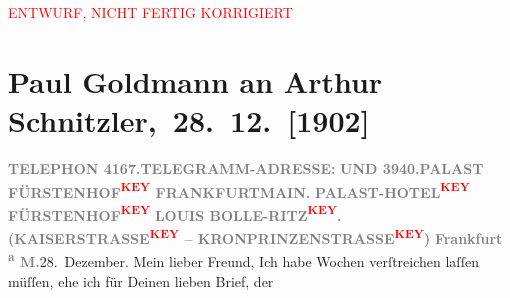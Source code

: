 
\begin{center}
            \textcolor{red}{ENTWURF, NICHT FERTIG KORRIGIERT}
                      \end{center}
            
         
         \renewcommand{\erwaehntePersonen}{Personen: Olga Schnitzler}
         \renewcommand{\erwaehnteOrte}{Orte: Frankfurt am Main, Wien}
         \renewcommand{\erwaehnteWerke}{}
               \section[ Paul Goldmann an Arthur Schnitzler, 28. 12. {[}1902{]}]{ Paul Goldmann an Arthur Schnitzler, 28. 12. {[}1902{]}}\nopagebreak{}\rehead{ }\begin{ledgroupsized}[t]{13cm}\normalsize\beginnumbering \toendnotes[C]{\smallbreak\pagebreak[2]} 
\pstart
           \noindent{}{\pb}\textcolor{gray}{\textbf{TELEPHON{ }\textbf{4167.}}}\hfill \textcolor{gray}{\textbf{TELEGRAMM-ADRESSE:}}\pend
           \pstart
           \textcolor{gray}{\textbf{UND{ }\textbf{3940.}}}\hfill \textcolor{gray}{\textbf{\textbf{PALAST FÜRSTENHOF\textcolor{red}{\textsuperscript{\textbf{KEY}}}{ }FRANKFURTMAIN.}}}\pend
           \pstart
           \centering{}\textcolor{gray}{\textbf{\textbf{PALAST-HOTEL\textcolor{red}{\textsuperscript{\textbf{KEY}}}}}}\pend
           \pstart
           \noindent{}\centering{}\textcolor{gray}{\textbf{FÜRSTENHOF\textcolor{red}{\textsuperscript{\textbf{KEY}}}}}\pend
           \pstart
           \noindent{}\centering{}\textcolor{gray}{\textbf{LOUIS BOLLE-RITZ\textcolor{red}{\textsuperscript{\textbf{KEY}}}.}}\pend
           \pstart
           \noindent{}\centering{}\textcolor{gray}{\textbf{(KAISERSTRASSE\textcolor{red}{\textsuperscript{\textbf{KEY}}} – KRONPRINZENSTRASSE\textcolor{red}{\textsuperscript{\textbf{KEY}}})}}\pend
           \pstart
           \raggedleft{}\textcolor{gray}{\textbf{Frankfurt \textsuperscript{a} M.}}28. Dezember.\pend
           \pstart\center{}Mein lieber Freund,\pend\pstart
           Ich habe Wochen verſtreichen laſſen müſſen, ehe ich für Deinen lieben Brief, der

\end{ledgroupsized}
